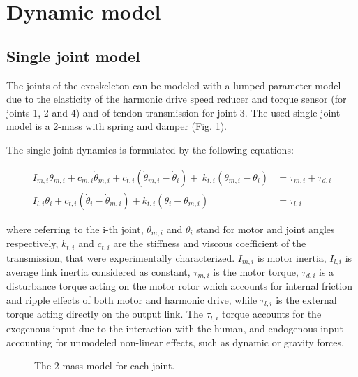 \section{Dynamic model} \label{sec:dynamic_model}

\subsection{Single joint model} \label{Single joint model}
The joints of the exoskeleton can be modeled with a lumped parameter model due to the elasticity of the harmonic drive speed reducer and torque sensor (for joints 1, 2 and 4) and of tendon transmission for joint 3. The used single joint model is a 2-mass with spring and damper (Fig. \ref{fig:exos_singlejoint_model}).

\par The single joint dynamics is formulated by the following equations:

\setlength{\arraycolsep}{0.0em}
\footnotesize
\begin{align}
I_{m,i} \ddot{\theta}_{m,i}  + c_{m,i}\dot{\theta}_{m,i} + c_{t,i} (\dot{\theta}_{m,i}-\dot{\theta}_{i})  
{+}\:k_{t,i} ({\theta_{m,i}}-{\theta_i}) &= \tau_{m,i}+\tau_ {d,i} \nonumber	\\
\label{eqn:dinamicaLinkSingoloGiunto}
I_{l,i} \ddot{\theta}_{i}+c_{t,i} (\dot{\theta}_{i}-\dot{\theta}_{m,i})
+k_{t,i} ({\theta_{i}}-{\theta_{m,i}}) &= \tau_{l,i}	
\end{align}
\normalsize
\setlength{\arraycolsep}{5pt}

where referring to the i-th joint, $\theta_ {m,i}$ and $\theta_ {i}$ stand for motor and joint angles respectively, $k_{t,i}$ and $c_{t,i}$ are the stiffness and viscous coefficient of the transmission, that were experimentally characterized.
$I_{m,i}$ is motor inertia, $I_{l,i}$ is average link inertia considered as constant, $\tau_{m,i}$ is the motor torque, $\tau_{d,i}$ is a disturbance torque acting on the motor rotor  which accounts for internal friction and ripple effects of both motor and harmonic drive, while $\tau_{l,i}$ is the external torque acting directly on the output link. The $\tau_{l,i}$ torque accounts for the 
exogenous input due to the interaction  with the human, and endogenous input accounting for unmodeled non-linear effects, such as dynamic or gravity forces.
\begin{figure}[ht]
	\centering
	\def\svgwidth{0.7\columnwidth}
	\begin{footnotesize}
		
	\end{footnotesize}
	\caption{The 2-mass model for each joint.}
	\label{fig:exos_singlejoint_model}
\end{figure}
